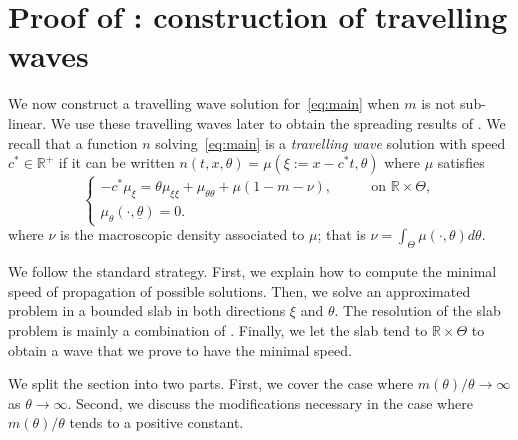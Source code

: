 \documentclass[11pt]{article}    %
\newcommand{\R}{\mathbb{R}}
\begin{document}
\section{Proof of : construction of travelling waves}\label{sec:tw}

We now construct a travelling wave solution for~\eqref{eq:main} when $m$ is not sub-linear.  We use these travelling waves later to obtain the spreading results of .  We recall that a function $n$ solving~\eqref{eq:main} is a \textit{travelling wave} solution with speed $c^* \in \R^+$ if it can be written $n(t,x,\theta)= \mu \left( \xi:= x - c^* t , \theta \right)$
where $\mu$ satisfies
\begin{equation}\label{eqkinwave}
\begin{cases}
- c^* \mu_{\xi} = \theta  \mu_{\xi \xi} + \mu_{\theta  \theta} + \mu  (1 - m - \nu),& \qquad \text{on } \R\times \Theta,\\
\mu_\theta (\cdot,\underline\theta) = 0.&
\end{cases}
\end{equation} 
where $\nu$ is the macroscopic density associated to $\mu$; that is $\nu = \int_\Theta \mu \left( \cdot, \theta \right) d \theta$.

We follow the standard strategy. First, we explain how to compute the minimal speed of propagation of possible solutions. Then, we solve an approximated problem in a bounded slab in both directions $\xi$ and $\theta$. The resolution of the slab problem is mainly a combination of \cite{AlfaroCovilleRaoul,BouinCalvez}. Finally, we let the slab tend to $\R \times \Theta$ to obtain a wave that we prove to have the minimal speed. 

We split the section into two parts.  First, we cover the case where $m(\theta)/\theta \to \infty$ as $\theta\to\infty$.  Second, we discuss the modifications necessary in the case where $m(\theta)/\theta$ tends to a positive constant.
\end{document}
